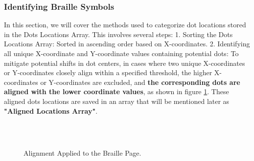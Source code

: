 \subsubsection{Identifying Braille Symbols}
In this section, we will cover the methods used to categorize dot locations stored in the Dots Locations Array. This involves several steps:
1. Sorting the Dots Locations Array: Sorted in ascending order based on X-coordinates.
2. Identifying all unique X-coordinate and Y-coordinate values containing potential dots: To mitigate potential shifts in dot centers, in cases where two unique X-coordinates or Y-coordinates closely align within a specified threshold, the higher X-coordinates or Y-coordinates are excluded, and \textbf{the corresponding dots are aligned with the lower coordinate values}, as shown in figure \ref{fig:num4}. These aligned dots locations are saved in an array that will be mentioned later as \textbf{"Aligned Locations Array"}.

\begin{figure}[H]
    \centering
    \\
    \\
    \caption{Alignment Applied to the Braille Page.}
    \label{fig:num4}
\end{figure}


